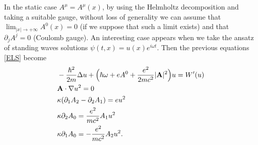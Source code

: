 \documentclass[11pt,leqno,twoside,reqno]{amsart}
\numberwithin{equation}{section}
\begin{document}
In the static case $A^{\mu}=A^{\mu}(x)$, by using the Helmholtz decomposition and  taking a suitable gauge, without loss of generality we can assume 
that $\lim_{|x|\to+\infty}A^0(x)=0$ (if we suppose that such a limit exists) and that $\partial_{j}A^{j}=0$ (Coulomb gauge).
An interesting case appears when we take the ansatz of standing waves
solutions  $\psi(t,x)=u(x)e^{i\omega t}$. 
Then the previous equations \eqref{ELS} become
\begin{equation}\label{ELF}
\begin{split}
&-\frac{\hbar^{2}}{2m}\Delta u+ \Big(\hbar\omega+e A^{0}+\frac{e^{2}}{2mc^{2}}|\mathbf A|^{2}\Big)u=W'(u)\\
&{\bf A}\cdot \nabla u^{2}=0\\
& \kappa(\partial_{1}A_{2}-\partial_{2}A_{1})=e u^{2} \\
& \kappa\partial_{2}A_{0}=\frac{e^2}{mc^2}A_1u^2\\ 
& \kappa\partial_{1}A_{0}=-\frac{e^2}{mc^2}A_2u^2.
\end{split}
\end{equation}
\end{document}
